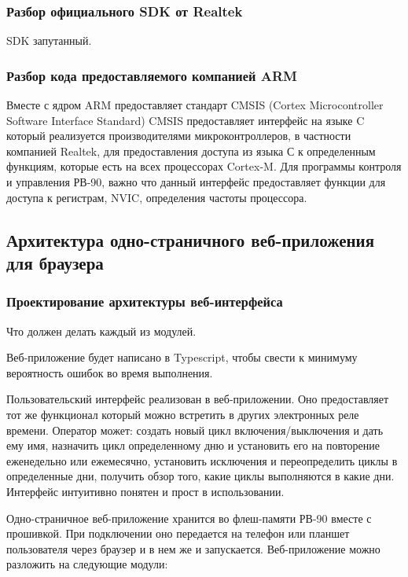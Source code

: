 \subsubsection{ Разбор официального SDK от Realtek }
SDK запутанный.



\subsubsection{ Разбор кода предоставляемого компанией ARM}
Вместе с ядром ARM предоставляет стандарт CMSIS  (Cortex Microcontroller Software Interface Standard)
CMSIS предоставляет интерфейс на языке C который реализуется производителями микроконтроллеров, в частности компанией Realtek, для предоставления доступа из языка С к определенным функциям, которые есть на всех процессорах Cortex-M. Для программы контроля и управления РВ-90, важно что данный интерфейс предоставляет функции для доступа к регистрам, NVIC, определения частоты процессора. 




\newpage
\subsection{Архитектура одно-страничного веб-приложения для браузера}


\subsubsection{ Проектирование архитектуры веб-интерфейса}
Что должен делать каждый из модулей.

Веб-приложение будет написано в Typescript, чтобы свести к минимуму вероятность ошибок во время выполнения.

Пользовательский интерфейс реализован в веб-приложении. Оно предоставляет тот же функционал который можно встретить в других электронных реле времени. Оператор может: создать новый цикл включения/выключения и дать ему имя, назначить цикл определенному дню и установить его на повторение еженедельно или ежемесячно, установить исключения и переопределить циклы в определенные дни, получить обзор того, какие циклы выполняются в какие дни. Интерфейс интуитивно понятен и прост в использовании.

Одно-страничное веб-приложение хранится во флеш-памяти РВ-90 вместе с прошивкой. При подключении оно передается на телефон или планшет пользователя через браузер и в нем же и запускается. Веб-приложение можно разложить на следующие модули:

